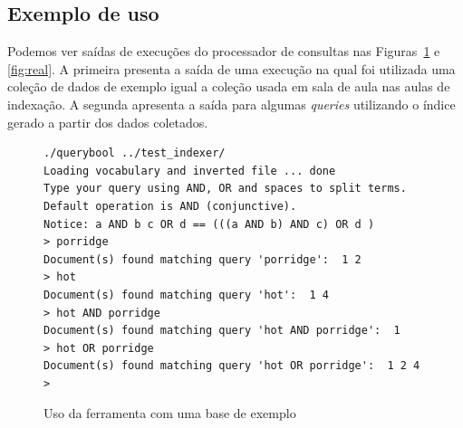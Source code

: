 \documentclass[10pt,twocolumn]{article}
\begin{document}
\subsection{Exemplo de uso}

Podemos ver saídas de execuções do processador de consultas nas
Figuras~\ref{fig:exemplo} e \ref{fig:real}. A primeira presenta a saída
de uma execução na qual foi utilizada uma coleção de dados de exemplo
igual a coleção usada em sala de aula nas aulas de indexação. A segunda
apresenta a saída para algumas \emph{queries} utilizando o índice gerado
a partir dos dados coletados.

\begin{figure}
\begin{center}
\begin{verbatim}
./querybool ../test_indexer/
Loading vocabulary and inverted file ... done
Type your query using AND, OR and spaces to split terms.
Default operation is AND (conjunctive).
Notice: a AND b c OR d == (((a AND b) AND c) OR d )
> porridge
Document(s) found matching query 'porridge':  1 2
> hot
Document(s) found matching query 'hot':  1 4
> hot AND porridge
Document(s) found matching query 'hot AND porridge':  1
> hot OR porridge
Document(s) found matching query 'hot OR porridge':  1 2 4
>
\end{verbatim}
\caption{Uso da ferramenta com uma base de exemplo}
\label{fig:exemplo}
\end{center}
\end{figure}
\end{document}
